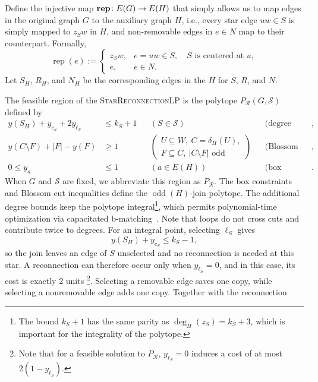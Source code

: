 \documentclass[11pt]{amsart}
\DeclareMathOperator{\odd}{odd}
\newcommand{\rep}[1]{\operatorname{rep}(#1)}
\newcommand{\1}{\mathbbm{1}}
\newcommand{\LPtwo}{\textsc{StarReconnectionLP}}
\begin{document}
Define the injective map {$\operatorname{\bf rep}\colon E(G)\to E(H)$ that simply allows us to map edges in the original graph $G$ to the auxiliary graph $H$, i.e., every star edge $uw \in S$ is simply mapped to $z_S w$ in $H$, and non-removable edges in $e\in N$ map to their counterpart. Formally, } 
\[
  \rep{e}:=
 \begin{cases}
  z_Sw,&e=uw\in S,\quad S\text{ is centered at }u,\\[3pt]
  e , &e\in N.
 \end{cases}
\]
{Let $S_H$, $R_H$,
and $N_H$ be the corresponding edges in the $H$ for $S$, $R$, and $N$.}

The feasible region of the \LPtwo{} is the polytope
${P_{\mathcal R}}(G,\mathcal S)$ defined by
\begin{equation}
\label{proc:repair-polytope}
\begin{aligned}
 y(S_H)+y_{c_S}+2y_{\ell_S}
 &\le k_S+1
 &&(S\in\mathcal S)
 &&{\text{(degree bounds)}},\\[4pt]
 y(C\setminus F)+|F|-y(F)
 &\ge1
 &&\left(
 \begin{gathered}
 U\subseteq W,\ C=\delta_H(U),\\[-2pt]
 F\subseteq C,\ |C\setminus F|\text{ odd}
 \end{gathered}
 \right)
 &&{\text{(Blossom cut inequalities)}},\\[4pt]
 0\le y_a&\le1
 &&(a\in E(H))
 &&{\text{(box constraints)}}.
\end{aligned}
\end{equation}
{When $G$ and $\mathcal S$ are fixed, we abbreviate this region
as $P_{\mathcal R}$}. The box constraints and Blossom cut inequalities
{define the $\odd(H)$-join polytope.} {The additional degree bounds keep the polytope integral\footnote{The bound $k_S+1$ has the same parity as
$\deg_H(z_S)=k_S+3$, which is important for the integrality of the polytope.}, which permits polynomial-time
optimization via capacitated b-matching~\cite{Schrijver2003}. Note that loops} do not cross cuts and contribute twice to degrees.
For an integral point, selecting $\ell_S$ gives
\[
 y(S_H)+y_{c_S}\le k_S-1,
\]
so the join leaves an edge of $S$ unselected and no reconnection
is needed at this star. {A reconnection can therefore occur only
when $y_{\ell_S}=0$, and in this case, its cost is exactly 2 units} \footnote{{Note that for a feasible solution to $P_{\mathcal R}$, $y_{\ell_S}=0$ induces a cost of at most $2(1-y_{\ell_S})$.}}. Selecting a removable edge saves one copy, while selecting
a nonremovable edge adds one copy. Together with the reconnection
\end{document}
